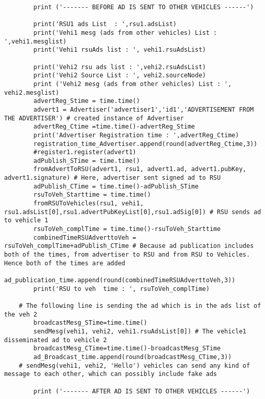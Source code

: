 \begin{linenumbers}
\begin{lstlisting}
        print ('------- BEFORE AD IS SENT TO OTHER VEHICLES ------')

        print('RSU1 ads List  : ',rsu1.adsList)
        print('Vehi1 mesg (ads from other vehicles) List : ',vehi1.mesglist)
        print('Vehi1 rsuAds list : ', vehi1.rsuAdsList)

        print('Vehi2 rsu ads list : ',vehi2.rsuAdsList)
        print('Vehi2 Source List : ', vehi2.sourceNode)
        print ('Vehi2 mesg (ads from other vehicles) List : ', vehi2.mesglist)
        advertReg_Stime = time.time()
        advert1 = Advertiser('advertiser1','id1','ADVERTISEMENT FROM THE ADVERTISER') # created instance of Advertiser
        advertReg_Ctime =time.time()-advertReg_Stime
        print('Advertiser Registration time : ',advertReg_Ctime)
        registration_time_Advertiser.append(round(advertReg_Ctime,3))
        #register1.register(advert1)
        adPublish_STime = time.time()
        fromAdvertToRSU(advert1, rsu1, advert1.ad, advert1.pubKey, advert1.signature) # Here, advertiser sent signed ad to RSU 
        adPublish_CTime = time.time()-adPublish_STime
        rsuToVeh_Starttime = time.time()
        fromRSUToVehicles(rsu1, vehi1, rsu1.adsList[0],rsu1.advertPubKeyList[0],rsu1.adSig[0]) # RSU sends ad to vehicle 1
        rsuToVeh_complTime = time.time()-rsuToVeh_Starttime
        combinedTimeRSUAdverttoVeh = rsuToVeh_complTime+adPublish_CTime # Because ad publication includes both of the times, from advertiser to RSU and from RSU to Vehicles. Hence both of the times are added
        ad_publication_time.append(round(combinedTimeRSUAdverttoVeh,3))
        print('RSU to veh  time : ', rsuToVeh_complTime)
   
    # The following line is sending the ad which is in the ads list of the veh 2
        broadcastMesg_STime=time.time()
        sendMesg(vehi1, vehi2, vehi1.rsuAdsList[0]) # The vehicle1 disseminated ad to vehicle 2
        broadcastMesg_CTime=time.time()-broadcastMesg_STime
        ad_Broadcast_time.append(round(broadcastMesg_CTime,3))
    # sendMesg(vehi1, vehi2, 'Hello') vehicles can send any kind of message to each other, which can possibly include fake ads

        print ('------- AFTER AD IS SENT TO OTHER VEHICLES ------')


\end{lstlisting}
\end{linenumbers}
